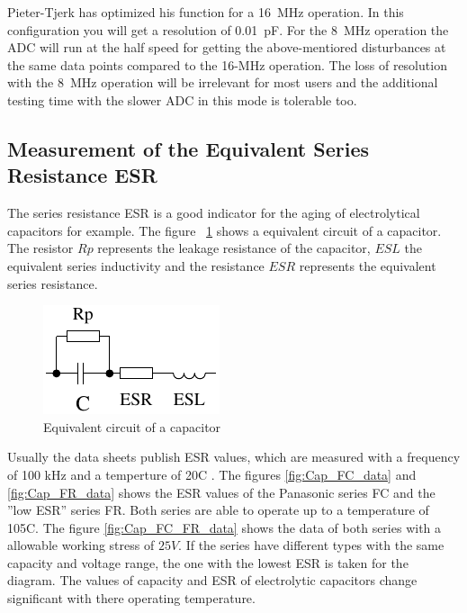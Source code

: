 Pieter-Tjerk has optimized his function for a 16~MHz operation.
In this configuration you will get a resolution of 0.01~pF.
For the 8~MHz operation the ADC will run at the half speed for getting the above-mentiored disturbances
at the same data points compared to the 16-MHz operation.
The loss of resolution with the 8~MHz operation will be irrelevant for most users and the
additional testing time with the slower ADC in this mode is tolerable too.



\subsection{Measurement of the Equivalent Series Resistance ESR}
The series resistance ESR \cite{ESR} is a good indicator for the aging of electrolytical capacitors for example.
The figure ~\ref{fig:Cap_equiv} shows a equivalent circuit of a capacitor.
The resistor \(Rp\) represents the leakage resistance of the capacitor, \(ESL\) the equivalent series inductivity and
the resistance \(ESR\) represents the equivalent series resistance.

\begin{figure}[H]
  \centering
    \includegraphics[]{../FIG/Cap_equiv.pdf}
  \caption{Equivalent circuit of a capacitor}
  \label{fig:Cap_equiv}
\end{figure}

Usually the data sheets publish ESR values, which are measured with a frequency of 100 kHz and a temperture 
of 20\textdegree C .
The figures \ref{fig:Cap_FC_data} and \ref{fig:Cap_FR_data} shows the ESR values of the Panasonic series FC and 
the ''low ESR'' series FR.
Both series are able to operate up to a temperature of 105\textdegree C.
The figure \ref{fig:Cap_FC_FR_data} shows the data of both series with a allowable working stress of \(25V\).
If the series have different types with the same capacity and voltage range, the one with the lowest ESR is
taken for the diagram.
The values of capacity and ESR of electrolytic capacitors change significant with there operating temperature.

